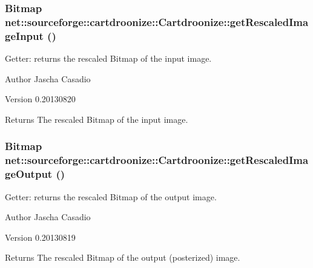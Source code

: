 \hypertarget{classnet_1_1sourceforge_1_1cartdroonize_1_1Cartdroonize_a8c833305bf05155765244feac04ba3ac}{
\subsubsection[{getRescaledImageInput}]{\setlength{\rightskip}{0pt plus 5cm}Bitmap net::sourceforge::cartdroonize::Cartdroonize::getRescaledImageInput ()}}
\label{classnet_1_1sourceforge_1_1cartdroonize_1_1Cartdroonize_a8c833305bf05155765244feac04ba3ac}


Getter: returns the rescaled Bitmap of the input image. \begin{DoxyAuthor}{Author}
Jascha Casadio 
\end{DoxyAuthor}
\begin{DoxyVersion}{Version}
0.20130820 
\end{DoxyVersion}
\begin{DoxyReturn}{Returns}
The rescaled Bitmap of the input image.
\end{DoxyReturn}


\hypertarget{classnet_1_1sourceforge_1_1cartdroonize_1_1Cartdroonize_a2245840b5632ebe6fda46c2d72a65e6b}{
\subsubsection[{getRescaledImageOutput}]{\setlength{\rightskip}{0pt plus 5cm}Bitmap net::sourceforge::cartdroonize::Cartdroonize::getRescaledImageOutput ()}}
\label{classnet_1_1sourceforge_1_1cartdroonize_1_1Cartdroonize_a2245840b5632ebe6fda46c2d72a65e6b}


Getter: returns the rescaled Bitmap of the output image. \begin{DoxyAuthor}{Author}
Jascha Casadio 
\end{DoxyAuthor}
\begin{DoxyVersion}{Version}
0.20130819 
\end{DoxyVersion}
\begin{DoxyReturn}{Returns}
The rescaled Bitmap of the output (posterized) image.
\end{DoxyReturn}



